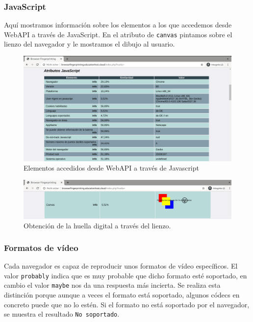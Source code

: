 \subsubsection{JavaScript}
Aquí mostramos información sobre los elementos a los que accedemos desde WebAPI a través de JavaScript. En el atributo de \texttt{canvas} pintamos sobre el lienzo del navegador y le mostramos el dibujo al usuario.

\begin{figure}[H]
	\centering
	\includegraphics[width=1\textwidth]{Images/javaScriptSection.png}
	\caption{Elementos accedidos desde WebAPI a través de Javascript}
	\label{fig:javaScriptSection.png}
\end{figure}

\begin{figure}[H]
	\centering
	\includegraphics[width=1\textwidth]{Images/canvas.png}
	\caption{Obtención de la huella digital a través del lienzo.}
	\label{fig:canvas.png}
\end{figure}

\subsubsection{Formatos de vídeo}
Cada navegador es capaz de reproducir unos formatos de vídeo específicos. El valor \texttt{probably} indica que es muy probable que dicho formato esté soportado, en cambio el valor \texttt{maybe} nos da una respuesta más incierta. Se realiza esta distinción porque aunque a veces el formato está soportado, algunos códecs en concreto puede que no lo estén. Si el formato no está soportado por el navegador, se muestra el resultado \texttt{No soportado}.

